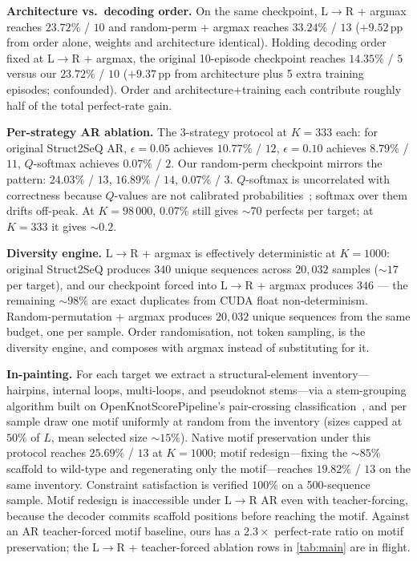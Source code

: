 \documentclass{article}
\begin{document}
\noindent\textbf{Architecture vs.\ decoding order.} On the same checkpoint,
L$\to$R + argmax reaches $23.72\%$ / $10$ and random-perm + argmax
reaches $33.24\%$ / $13$ ($+9.52$\,pp from order alone, weights and
architecture identical). Holding decoding order fixed at L$\to$R +
argmax, the original 10-episode checkpoint reaches $14.35\%$ / $5$
versus our $23.72\%$ / $10$ ($+9.37$\,pp from architecture plus 5
extra training episodes; confounded). Order and architecture+training
each contribute roughly half of the total perfect-rate gain.

\noindent\textbf{Per-strategy AR ablation.} The 3-strategy protocol at
$K{=}333$ each: for original Struct2SeQ AR, $\epsilon{=}0.05$ achieves
$10.77\%$ / $12$, $\epsilon{=}0.10$ achieves $8.79\%$ / $11$,
$Q$-softmax achieves $0.07\%$ / $2$. Our random-perm checkpoint
mirrors the pattern: $24.03\%$ / $13$, $16.89\%$ / $14$, $0.07\%$ /
$3$. $Q$-softmax is uncorrelated with correctness because $Q$-values
are not calibrated probabilities~\citep[\S 2.7]{he2026struct2seq};
softmax over them drifts off-peak. At $K{=}98\,000$, $0.07\%$ still
gives ${\sim}70$ perfects per target; at $K{=}333$ it gives
${\sim}0.2$.

\noindent\textbf{Diversity engine.} L$\to$R + argmax is effectively
deterministic at $K{=}1000$: original Struct2SeQ produces $340$
unique sequences across $20{,}032$ samples (${\sim}17$ per target),
and our checkpoint forced into L$\to$R + argmax produces $346$ — the
remaining ${\sim}98\%$ are exact duplicates from CUDA float
non-determinism. Random-permutation + argmax produces $20{,}032$
unique sequences from the same budget, one per sample. Order
randomisation, not token sampling, is the diversity engine, and
composes with argmax instead of substituting for it.

\noindent\textbf{In-painting.} For each target we extract a
structural-element inventory---hairpins, internal loops,
multi-loops, and pseudoknot stems---via a stem-grouping algorithm
built on OpenKnotScorePipeline's pair-crossing
classification~\citep{openknotscorepipeline}, and per sample draw
one motif uniformly at random from the inventory (sizes capped at
$50\%$ of $L$, mean selected size ${\sim}15\%$). Native motif
preservation under this protocol reaches $25.69\%$ / $13$ at
$K{=}1000$; motif redesign---fixing the ${\sim}85\%$ scaffold to
wild-type and regenerating only the motif---reaches $19.82\%$ /
$13$ on the same inventory. Constraint satisfaction is verified
$100\%$ on a 500-sequence sample. Motif redesign is inaccessible
under L$\to$R AR even with teacher-forcing, because the decoder
commits scaffold positions before reaching the motif. Against an
AR teacher-forced motif baseline, ours has a $2.3\times$
perfect-rate ratio on motif preservation; the L$\to$R +
teacher-forced ablation rows in \cref{tab:main} are in flight.
\end{document}
